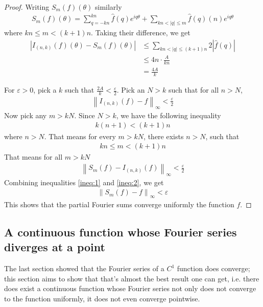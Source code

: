 \documentclass[12pt, titlepage]{article}
\theoremstyle{definition}
\newcommand{\vep}{\varepsilon}
\newcommand{\norm}[1]{\left\lVert#1\right\rVert}
\begin{document}
\begin{proof}
    Writing $S_m(f)(\theta)$ similarly
    \begin{align*}
     S_m(f)(\theta) = \sum_{q=-kn}^{kn} \widehat{f}(q) e^{iq\theta} + \sum_{kn < |q| \leq m} \widehat{f}(q)(n) e^{iq\theta}
    \end{align*}
    where $kn \leq m < (k+1)n$.
    Taking their difference, we get
    \begin{align*}
        |I_{(n,k)}(f)(\theta) - S_m(f)(\theta)| &\leq \sum_{kn < |q| \leq (k+1)n} 2|\widehat{f}(q)| \\
        &\leq 4n \cdot \frac{A}{kn} \\
        &= \frac{4A}{k}
    \end{align*}
    
    For $\vep > 0$, pick a $k$ such that $\frac{2A}{k} < \frac{\vep}{2}$. Pick an $N > k$ such that for all $n > N$,
    \begin{align}
        \norm{I_{(n,k)}(f) - f}_{\infty} < \frac{\vep}{2} \label{ineq:1}
    \end{align}
    Now pick any $m > kN$. Since $N > k$, we have the following inequality
    \begin{align*}
        k(n+1) < (k+1)n
    \end{align*}
    where $n > N$. That means for every $m > kN$, there exists $n > N$, such that
    \begin{align*}
        kn \leq  m < (k+1)n
    \end{align*}
    That means for all $m > kN$
    \begin{align}
        \norm{S_m(f) - I_{(n,k)}(f)}_\infty < \frac{\vep}{2} \label{ineq:2}
    \end{align}
    Combining inequalities \ref{ineq:1} and \ref{ineq:2}, we get
    \begin{align*}
        \norm{S_m(f) - f}_\infty < \vep
    \end{align*}
    This shows that the partial Fourier sums converge uniformly the function $f$.
\end{proof}

\subsection{A continuous function whose Fourier series diverges at a point \cite{banach}}
The last section showed that the Fourier series of a $C^1$ function does converge; this section aims to show that that's almost the best result one can get, i.e. there does exist a continuous function whose Fourier series not only does not converge to the function uniformly, it does not even converge pointwise.
\end{document}
